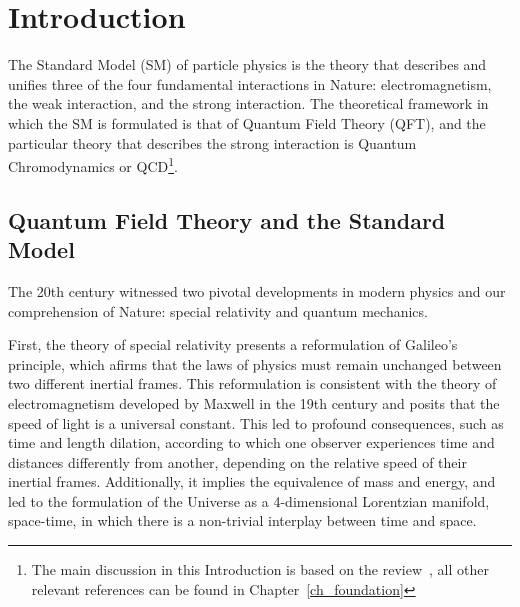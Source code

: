 \chapter*{Introduction}

\label{ch_introduction}



The Standard Model (SM) of particle physics is the theory that describes and unifies three of the four fundamental interactions in Nature: electromagnetism, the weak interaction, and the strong interaction. The theoretical framework in which the SM is formulated is that of Quantum Field Theory (QFT), and the particular theory that describes the strong interaction is Quantum Chromodynamics or QCD\footnote{The main discussion in this Introduction is based on the review~\citep{Wilczek:1998ma}, all other relevant references can be found in Chapter~\ref{ch_foundation}}.

\section*{Quantum Field Theory and the Standard Model}

The 20th century witnessed two pivotal developments in modern physics and our comprehension of Nature: special relativity and quantum mechanics. 

First, the theory of special relativity presents a reformulation of Galileo's principle, which afirms that the laws of physics must remain unchanged between two different inertial frames. This reformulation is consistent with the theory of electromagnetism developed by Maxwell in the 19th century and posits that the speed of light is a universal constant. This led to profound consequences, such as time and length dilation, according to which one observer experiences time and distances differently from another, depending on the relative speed of their inertial frames. Additionally, it implies the equivalence of mass and energy, and led to the formulation of the Universe as a 4-dimensional Lorentzian manifold, space-time, in which there is a non-trivial interplay between time and space.


